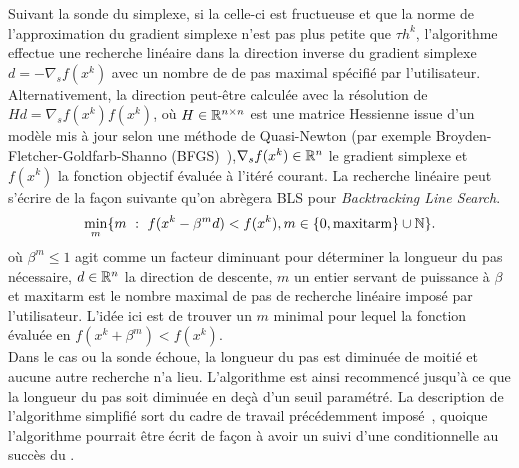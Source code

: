 Suivant la sonde du simplexe, si la celle-ci est fructueuse et que la norme de l'approximation du gradient simplexe n'est pas plus petite que $\tau h^k$, l'algorithme effectue une recherche linéaire dans la direction inverse du gradient simplexe $ d = -\nabla_{s}f(x^k)$ avec un nombre de de pas maximal spécifié par l'utilisateur. Alternativement, la direction peut-être calculée avec la résolution de $Hd = \nabla_{s}f(x^k)f(x^k)$, où $H \in \mathbb{R}^{n\times n}$ est une matrice Hessienne issue d'un modèle mis à jour selon une méthode de Quasi-Newton (par exemple Broyden-Fletcher-Goldfarb-Shanno (BFGS)~\cite{Broy65a,Flet65a}),$\nabla_{s}f(x^k) \in \mathbb{R}^n$ le gradient simplexe et $f(x^k)$ la fonction objectif évaluée à l'itéré courant. La recherche linéaire peut s'écrire de la façon suivante qu'on abrègera \textsf{BLS} pour \textit{Backtracking Line Search}. 
\begin{gather}
\underset{m}{\min}\{m~:~f(x^k-\beta^m d) < f(x^k),m \in \{0,\text{maxitarm}\}\cup\mathbb{N}\}.
\end{gather}
où $\beta^m\leq 1$ agit comme un facteur diminuant pour déterminer la longueur du pas nécessaire, $d \in \mathbb{R}^n$ la direction de descente, $m$ un entier servant de puissance à $\beta$ et  $\text{maxitarm}$ est le nombre maximal de pas de recherche linéaire imposé par l'utilisateur. L'idée ici est de trouver un $m$ minimal pour lequel la fonction évaluée en $f(x^k+\beta^m)<f(x^k)$.\\
Dans le cas ou la sonde échoue, la longueur du pas est diminuée de moitié et aucune autre recherche n'a lieu. L'algorithme est ainsi recommencé jusqu'à ce que la longueur du pas soit diminuée en deçà d'un seuil paramétré. La description de l'algorithme simplifié sort du cadre de travail précédemment imposé~\cite{BoDeFrSeToTr99a}, quoique l'algorithme pourrait être écrit de façon à avoir un \POLL suivi d'une \SEARCH conditionnelle au succès du \POLL.\\
